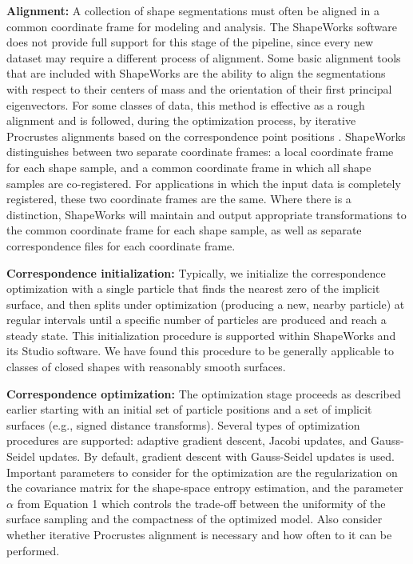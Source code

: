 \documentclass[letterpaper,12pt]{article}   %
\begin{document}
\vspace{0.1in}
\noindent\textbf{Alignment:} A collection of shape segmentations must often be aligned in a common coordinate frame for modeling and analysis. The ShapeWorks software does not provide full support for this stage of the pipeline, since every new dataset may require a different process of alignment. Some basic alignment tools that are included with ShapeWorks are the ability to align the segmentations with respect to their centers of mass and the orientation of their first principal eigenvectors. For some classes of data, this method is effective as a rough alignment and is followed, during the optimization process, by iterative Procrustes alignments based on the correspondence point positions \cite{goodall1991procrustes}. ShapeWorks distinguishes between two separate coordinate frames: a local coordinate frame for each shape sample, and a common coordinate frame in which all shape samples are co-registered. For applications in which the input data is completely registered, these two coordinate frames are the same. Where there is a distinction, ShapeWorks will maintain and output appropriate transformations to the common coordinate frame for each shape sample, as well as separate correspondence files for each coordinate frame.

\vspace{0.1in}
\noindent\textbf{Correspondence initialization:} Typically, we initialize the correspondence optimization with a single particle that finds the nearest zero of the implicit surface, and then splits under optimization (producing a new, nearby particle) at regular intervals until a specific number of particles are produced and reach a steady state. This initialization procedure is supported within ShapeWorks and its Studio software. We have found this procedure to be generally applicable to classes of closed shapes with reasonably smooth surfaces. %

\vspace{0.1in}
\noindent\textbf{Correspondence optimization:} The optimization stage proceeds as described earlier starting with an initial set of particle positions and a set of implicit surfaces (e.g., signed distance transforms). Several types of optimization procedures are supported: adaptive gradient descent, Jacobi updates, and Gauss-Seidel updates. By default, gradient descent with Gauss-Seidel updates is used. Important parameters to consider for the optimization are the regularization on the covariance matrix for the shape-space entropy estimation, and the parameter $\alpha$ from Equation 1 which controls the trade-off between the uniformity of the surface sampling and the compactness of the optimized model. Also consider whether iterative Procrustes alignment is necessary and how often to it can be performed. %
\end{document}
